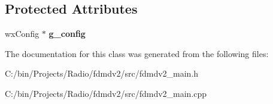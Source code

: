 \subsection*{Protected Attributes}
\begin{DoxyCompactItemize}
\item 
\hypertarget{class_main_app_ae6022a31caf96dbcc2f519fc5fdc0bbe}{wx\-Config $\ast$ {\bfseries g\-\_\-config}}\label{class_main_app_ae6022a31caf96dbcc2f519fc5fdc0bbe}

\end{DoxyCompactItemize}


The documentation for this class was generated from the following files\-:\begin{DoxyCompactItemize}
\item 
C\-:/bin/\-Projects/\-Radio/fdmdv2/src/fdmdv2\-\_\-main.\-h\item 
C\-:/bin/\-Projects/\-Radio/fdmdv2/src/fdmdv2\-\_\-main.\-cpp\end{DoxyCompactItemize}
